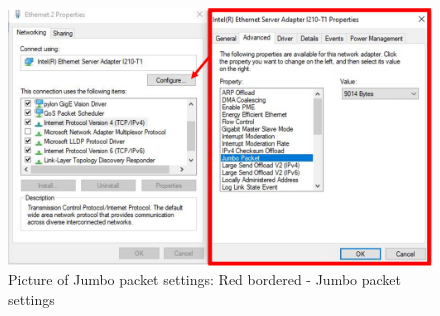 \begin{figure}
\begin{center}
\includegraphics[width=12cm]{Pictures/AppJumbo}
\caption[Picture of Jumbo packet settings]{Picture of Jumbo packet settings: Red bordered - Jumbo packet settings}
\label{AppJumbo}
\end{center}
\end{figure}













